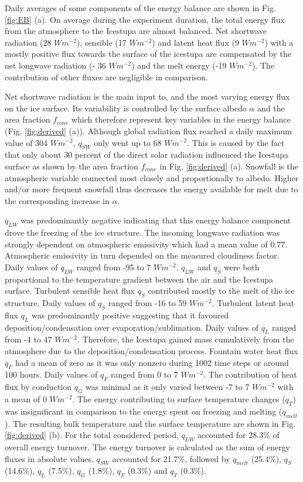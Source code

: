 \documentclass[utf8]{frontiersSCNS} %
\begin{document}
Daily averages of some components of the energy balance are shown in Fig.  \ref{fig:EB} (a). On average during the
experiment duration, the total energy flux from the atmosphere to the Icestupa are almost balanced. Net shortwave
radiation (28 $Wm^{-2}$), sensible (17 $Wm^{-2}$) and latent heat flux (9 $Wm^{-2}$) with a mostly positive flux towards
the surface of the icestupa are compensated by the net longwave radiation (- 36 $Wm^{-2}$) and the melt energy (-19
$Wm^{-2}$). The contribution of other fluxes are negligible in comparison.

Net shortwave radiation is the main input to, and the most varying energy flux on the ice surface. Its variability is
controlled by the surface albedo $\alpha$ and the area fraction $f_{cone}$ which therefore represent key variables in
the energy balance (Fig. \ref{fig:derived} (a)). Although global radiation flux reached a daily maximum value of 304
$Wm^{-2}$, $q_{SW}$ only went up to 68 $Wm^{-2}$. This is caused by the fact that only about 30 percent of the direct
solar radiation influenced the Icestupa surface as shown by the area fraction $f_{cone}$ in Fig. \ref{fig:derived} (a).
Snowfall is the atmospheric variable connected most closely and proportionally to albedo.  Higher and/or more frequent
snowfall thus decreases the energy available for melt due to the corresponding increase in $\alpha$. 

$q_{LW}$ was predominantly negative indicating that this energy balance component drove the freezing of the ice
structure. The incoming longwave radiation was strongly dependent on atmospheric emissivity which had a mean value of
0.77. Atmospheric emissivity in turn depended on the measured cloudiness factor. Daily values of $q_{LW}$ ranged from
-95 to 7 $Wm^{-2}$.  $q_{LW}$ and $q_{S}$ were both proportional to the temperature gradient between the air and the
Icestupa surface. Turbulent sensible heat flux $q_{S}$ contributed mostly to the melt of the ice structure. Daily values
of $q_{S}$ ranged from -16 to 59 $Wm^{-2}$. Turbulent latent heat flux $q_{L}$ was predominantly positive suggesting
that it favoured deposition/condensation over evaporation/sublimation. Daily values of $q_{L}$ ranged from -4 to 47
$Wm^{-2}$. Therefore, the Icestupa gained mass cumulatively from the atmosphere due to the deposition/condensation
process. Fountain water heat flux $q_{F}$ had a mean of zero as it was only nonzero during 1002 time steps or around 100
hours. Daily values of $q_{F}$ ranged from 0 to 7 $Wm^{-2}$. The contribution of heat flux by conduction $q_{G}$ was
minimal as it only varied between -7 to 7 $Wm^{-2}$ with a mean of 0 $Wm^{-2}$. The energy contributing to surface
temperature changes ($q_{T}$) was insignificant in comparison to the energy spent on freezing and melting ($q_{melt}$).
The resulting bulk temperature and the surface temperature are shown in Fig. \ref{fig:derived} (b).  For the total
considered period, $q_{LW}$ accounted for 28.3\% of overall energy turnover. The energy turnover is calculated as the
sum of energy fluxes in absolute values. $q_{SW}$ accounted for 21.7\%, followed by $q_{melt}$ (25.4\%), $q_{S}$
(14.6\%), $q_{L}$ (7.5\%), $q_{G}$ (1.8\%), $q_{F}$ (0.3\%) and $q_{T}$ (0.3\%).
\end{document}
